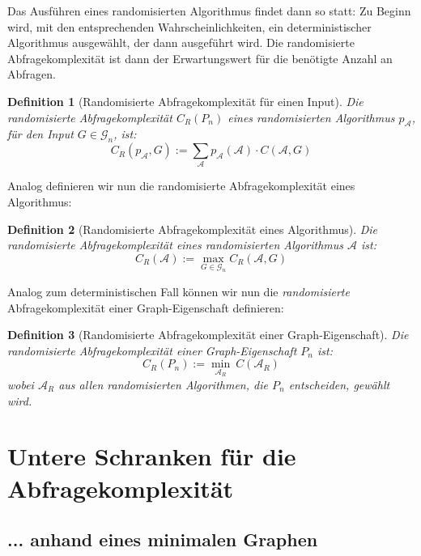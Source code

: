 \documentclass[a4paper]{scrreprt}
\newtheorem{definition}{Definition}
\theoremstyle{definition}
\begin{document}
Das Ausführen eines randomisierten Algorithmus findet
dann so statt: Zu Beginn wird, mit den entsprechenden
Wahrscheinlichkeiten, ein deterministischer Algorithmus
ausgewählt, der dann ausgeführt wird.
Die randomisierte Abfragekomplexität ist dann der
Erwartungswert für die benötigte Anzahl an Abfragen.

\begin{definition}[Randomisierte Abfragekomplexität für einen Input]
\label{def:randComplInput}
Die \emph{randomisierte Abfragekomplexität} $C_R(P_n)$ eines randomisierten
Algorithmus $p_\mathcal{A}$, für den Input $G\in \mathcal{G}_n$, ist:
$$ C_R(p_\mathcal{A}, G) := 
\sum_\mathcal{A} p_\mathcal{A}(\mathcal{A}) \cdot C(\mathcal{A}, G) $$
\end{definition}
Analog definieren wir nun die randomisierte Abfragekomplexität
eines Algorithmus:
\begin{definition}[Randomisierte Abfragekomplexität eines Algorithmus]
Die \emph{randomisierte Abfragekomplexität} eines randomisierten
Algorithmus $\mathcal{A}$ ist:
$$ C_R(\mathcal{A}) := \max_{G\in\mathcal{G}_n} C_R(\mathcal{A}, G) $$
\end{definition}
Analog zum deterministischen Fall können wir nun die
\emph{randomisierte} Abfragekomplexität einer Graph-Eigenschaft
definieren:
\begin{definition}[Randomisierte Abfragekomplexität einer Graph-Eigenschaft]
\label{def:randComplProp}
Die \emph{randomisierte Abfragekomplexität} einer Graph-Eigenschaft
$P_n$ ist:
$$ C_R(P_n) := \min_{\mathcal{A}_R}\ C(\mathcal{A}_R)$$
wobei $\mathcal{A}_R$ aus allen randomisierten Algorithmen,
die $P_n$ entscheiden, gewählt wird.
\end{definition}

\section{Untere Schranken für die Abfragekomplexität}

\subsection{... anhand eines minimalen Graphen}
\end{document}
